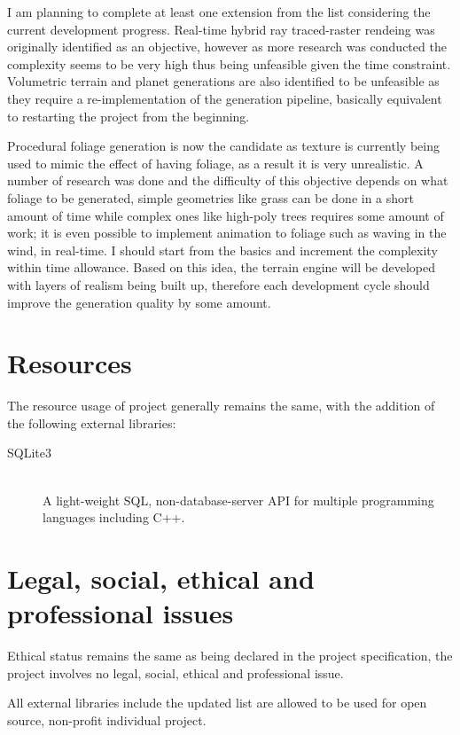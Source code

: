 \documentclass[oneside, a4paper]{article}
\begin{document}
    I am planning to complete at least one extension from the list considering the current development progress. Real-time hybrid ray traced-raster rendeing was originally identified as an objective, however as more research was conducted the complexity seems to be very high thus being unfeasible given the time constraint. Volumetric terrain and planet generations are also identified to be unfeasible as they require a re-implementation of the generation pipeline, basically equivalent to restarting the project from the beginning.

    Procedural foliage generation is now the candidate as texture is currently being used to mimic the effect of having foliage, as a result it is very unrealistic. A number of research was done and the difficulty of this objective depends on what foliage to be generated, simple geometries like grass can be done in a short amount of time while complex ones like high-poly trees requires some amount of work; it is even possible to implement animation to foliage such as waving in the wind, in real-time. I should start from the basics and increment the complexity within time allowance. Based on this idea, the terrain engine will be developed with layers of realism being built up, therefore each development cycle should improve the generation quality by some amount.

    \section{Resources}
    The resource usage of project generally remains the same, with the addition of the following external libraries:

    \begin{description}
        \item[SQLite3] \hfill \\
            A light-weight SQL, non-database-server API for multiple programming languages including C++.
    \end{description}

    \section{Legal, social, ethical and professional issues}
    Ethical status remains the same as being declared in the project specification, the project involves no legal, social, ethical and professional issue.

    All external libraries include the updated list are allowed to be used for open source, non-profit individual project.

    
    
\end{document}
